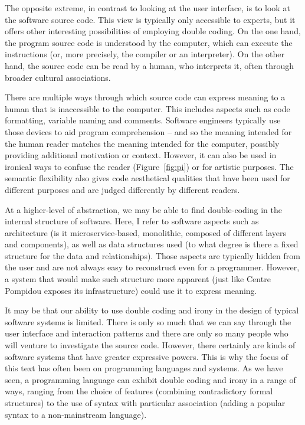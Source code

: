 The opposite extreme, in contrast to looking at the user interface, is to look at the software
source code. This view is typically only accessible to experts, but it offers other interesting
possibilities of employing double coding. On the one hand, the program source code is
understood by the computer, which can execute the instructions (or, more precisely, the
compiler or an interpreter). On the other hand, the source code can be read by a human, who
interprets it, often through broader cultural associations.

There are multiple ways through which source code can express meaning to a human that is
inaccessible to the computer. This includes aspects such as code formatting, variable naming
and comments. Software engineers typically use those devices to aid program comprehension --
and so the meaning intended for the human reader matches the meaning intended for the
computer, possibly providing additional motivation or context. However, it can also be
used in ironical ways to confuse the reader (Figure~\ref{fig:pi}) or for artistic
purposes. The semantic flexibility also gives
code aesthetical qualities that have been used for different purposes and are judged differently
by different readers.

At a higher-level of abstraction, we may be able to find double-coding in the internal structure
of software. Here, I refer to software aspects such as architecture (is it microservice-based,
monolithic, composed of different layers and components), as well as data structures used
(to what degree is there a fixed structure for the data and relationships).
Those aspects are typically hidden from the user and are not always easy to reconstruct even for
a programmer. However, a system that would make such structure more apparent (just like Centre
Pompidou exposes its infrastructure) could use it to express meaning.

It may be that our ability to use double coding and irony in the design of typical software
systems is limited. There is only so much that we can say through the user interface and
interaction patterns and there are only so many people who will venture to investigate the source
code. However, there certainly are kinds of software systems that have greater expressive powers.
This is why the focus of this text has often been on programming languages and systems.
As we have seen, a programming language can exhibit double coding and irony in a range of ways,
ranging from the choice of features (combining contradictory formal structures) to the use of
syntax with particular association (adding a popular syntax to a non-mainstream language).


